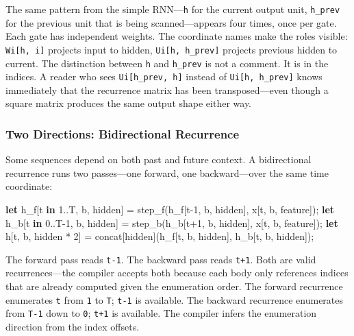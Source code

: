 \documentclass[11pt,]{article}
\newenvironment{Shaded}{}{}
\newcommand{\DecValTok}[1]{\textcolor[rgb]{0.25,0.63,0.44}{#1}}
\newcommand{\KeywordTok}[1]{\textcolor[rgb]{0.00,0.44,0.13}{\textbf{#1}}}
\newcommand{\NormalTok}[1]{#1}
\newcommand{\OperatorTok}[1]{\textcolor[rgb]{0.40,0.40,0.40}{#1}}
\begin{document}
The same pattern from the simple RNN---\texttt{h} for the current output
unit, \texttt{h\_prev} for the previous unit that is being
scanned---appears four times, once per gate. Each gate has independent
weights. The coordinate names make the roles visible:
\texttt{Wi{[}h,\ i{]}} projects input to hidden,
\texttt{Ui{[}h,\ h\_prev{]}} projects previous hidden to current. The
distinction between \texttt{h} and \texttt{h\_prev} is not a comment. It
is in the indices. A reader who sees \texttt{Ui{[}h\_prev,\ h{]}}
instead of \texttt{Ui{[}h,\ h\_prev{]}} knows immediately that the
recurrence matrix has been transposed---even though a square matrix
produces the same output shape either way.

\hypertarget{two-directions-bidirectional-recurrence}{%
\subsubsection{Two Directions: Bidirectional
Recurrence}\label{two-directions-bidirectional-recurrence}}

Some sequences depend on both past and future context. A bidirectional
recurrence runs two passes---one forward, one backward---over the same
time coordinate:

\begin{Shaded}
\begin{Highlighting}[]
\KeywordTok{let}\NormalTok{ h_f}\OperatorTok{[}\NormalTok{t }\KeywordTok{in} \DecValTok{1.}\NormalTok{.T, b, hidden}\OperatorTok{]}\NormalTok{ = step_f(h_f}\OperatorTok{[}\NormalTok{t-}\DecValTok{1}\NormalTok{, b, hidden}\OperatorTok{]}\NormalTok{, x}\OperatorTok{[}\NormalTok{t, b, feature}\OperatorTok{]}\NormalTok{);}
\KeywordTok{let}\NormalTok{ h_b}\OperatorTok{[}\NormalTok{t }\KeywordTok{in} \DecValTok{0.}\NormalTok{.T-}\DecValTok{1}\NormalTok{, b, hidden}\OperatorTok{]}\NormalTok{ = step_b(h_b}\OperatorTok{[}\NormalTok{t+}\DecValTok{1}\NormalTok{, b, hidden}\OperatorTok{]}\NormalTok{, x}\OperatorTok{[}\NormalTok{t, b, feature}\OperatorTok{]}\NormalTok{);}
\KeywordTok{let}\NormalTok{ h}\OperatorTok{[}\NormalTok{t, b, hidden * }\DecValTok{2}\OperatorTok{]}\NormalTok{ = concat}\OperatorTok{[}\NormalTok{hidden}\OperatorTok{]}\NormalTok{(h_f}\OperatorTok{[}\NormalTok{t, b, hidden}\OperatorTok{]}\NormalTok{, h_b}\OperatorTok{[}\NormalTok{t, b, hidden}\OperatorTok{]}\NormalTok{);}
\end{Highlighting}
\end{Shaded}

The forward pass reads \texttt{t-1}. The backward pass reads
\texttt{t+1}. Both are valid recurrences---the compiler accepts both
because each body only references indices that are already computed
given the enumeration order. The forward recurrence enumerates
\texttt{t} from \texttt{1} to \texttt{T}; \texttt{t-1} is available. The
backward recurrence enumerates from \texttt{T-1} down to \texttt{0};
\texttt{t+1} is available. The compiler infers the enumeration direction
from the index offsets.
\end{document}
